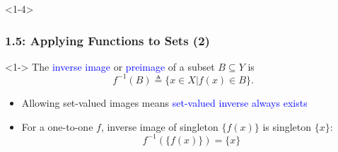 \documentclass[10pt,english,aspectratio=169]{beamer}
\begin{document}
\begin{frame}<1-4> \frametitle{1.5: Applying Functions to Sets (2)}

\begin{definition}<1->
The \textcolor{blue}{inverse image} or \textcolor{blue}{preimage} of a subset $B\subseteq Y$ is \vspace{-2mm}
\[ f^{-1}(B) \triangleq \{ x\in X | f(x)\in B\}. \]
\end{definition}

\begin{center}
\end{center}
\vspace{-2.5mm}

\begin{itemize}
  \setlength\itemsep{1.25mm}
  \item<3-> Allowing set-valued images means \textcolor{blue}{set-valued inverse always exists}
  \item<4-> For a one-to-one $f$, inverse image of singleton $\{ f(x) \}$ is singleton $\{ x \}$: \vspace{-0.5mm}
  \[ f^{-1}( \{f(x) \}) = \{x\} \]
\end{itemize}


\end{frame}  
\end{document}
